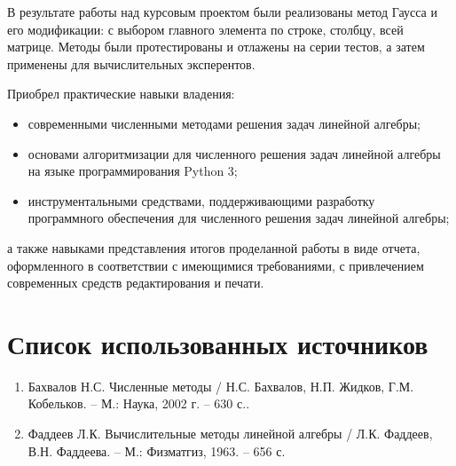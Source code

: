 \documentclass[14pt, a4paper]{extarticle}
\begin{document}
	В результате работы над курсовым проектом были реализованы метод Гаусса и его модификации: с выбором главного элемента по строке, столбцу, всей матрице. Методы были протестированы и отлажены на серии тестов, а затем применены для вычислительных эксперентов.
	
	Приобрел практические навыки владения:
	
	\begin{itemize}
	\item современными численными методами решения задач линейной алгебры;
	
	\item основами алгоритмизации для численного решения задач линейной алгебры на языке программирования Python 3;
	
	\item инструментальными средствами, поддерживающими разработку программного обеспечения для численного решения задач линейной алгебры;
	
	\end{itemize}
	а также навыками представления итогов проделанной работы в виде отчета, оформленного в соответствии с имеющимися требованиями, с привлечением современных средств редактирования и печати.
	\section{Список использованных источников}
	\begin{enumerate}
		\item Бахвалов Н.С. Численные методы / Н.С. Бахвалов, Н.П. Жидков, Г.М. Кобельков. -- М.: Наука, 2002 г. – 630 с..
		
		\item Фаддеев Л.К. Вычислительные методы линейной алгебры / Л.К. Фаддеев, В.Н. Фаддеева. -- М.: Физматгиз, 1963. -- 656 с.
	\end{enumerate}
	
\end{document}
